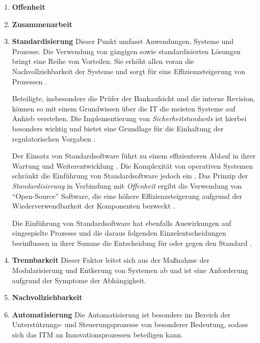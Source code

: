 \begin{enumerate}
    \item \textbf{Offenheit \cite{Brockhoff2006}}
    
    \item \textbf{Zusammenarbeit}

    \item \textbf{Standardisierung} 
    Dieser Punkt umfasst Anwendungen, Systeme und Prozesse. Die Verwendung von gängigen sowie standardisierten Lösungen bringt eine Reihe von Vorteilen. Sie erhöht allen voran die Nachvollziehbarkeit der Systeme und sorgt für eine Effizienzsteigerung von Prozessen \cite{Strietzel2018, Bussmann2006, Alt2017}. 
    
    Beteiligte, insbesondere die Prüfer der Bankaufsicht und die interne Revision, können so mit einem Grundwissen über die IT die meisten Systeme auf Anhieb verstehen. Die Implementierung von \emph{Sicherheitstandards \cite{IT-Grundschutz:2020, Disterer2013}} ist hierbei besonders wichtig und bietet eine Grundlage für die Einhaltung der regulatorischen Vorgaben \cite{MaRisk:2017, BAIT:2018}.
    
    Der Einsatz von Standardsoftware führt zu einem effizienteren Ablauf in ihrer Wartung und Weiterentwicklung \cite{Bussmann2006}. Die Komplexität von operativen Systemen schränkt die Einführung von Standardsoftware jedoch ein \cite[S.27]{Bussmann2006}. Das Prinzip der \emph{Standardisierung} in Verbindung mit \emph{Offenheit} ergibt die Verwendung von \enquote{Open-Source} Software, die eine höhere Effizienzsteigerung aufgrund der Wiederverwendbarkeit der Komponenten bezweckt \cite{Brockhoff2006, Gupta:2017}. 
    
    Die Einführung von Standardsoftware hat ebenfalls Auswirkungen auf eingespielte Prozesse und die daraus folgenden Einzelentscheidungen beeinflussen in ihrer Summe die Entscheidung für oder gegen den Standard \cite[Tab.1]{Manz2018}.
    
    \item \textbf{Trennbarkeit}
    Dieser Faktor leitet sich aus der Maßnahme der Modularisierung und Entkerung von Systemen \citet{Bussmann2006} ab und ist eine Anforderung aufgrund der Symptome der Abhängigkeit.
    
    \item \textbf{Nachvollziehbarkeit}
    
    
    \item \textbf{Automatisierung}
    Die Automatisierung ist besonders im Bereich der Unterstützungs- und Steuerungsprozesse \cite{Bussmann2006} von besonderer Bedeutung, sodass sich das \ac{ITM} an Innovationsprozessen beteiligen kann. 
    

\end{enumerate}
